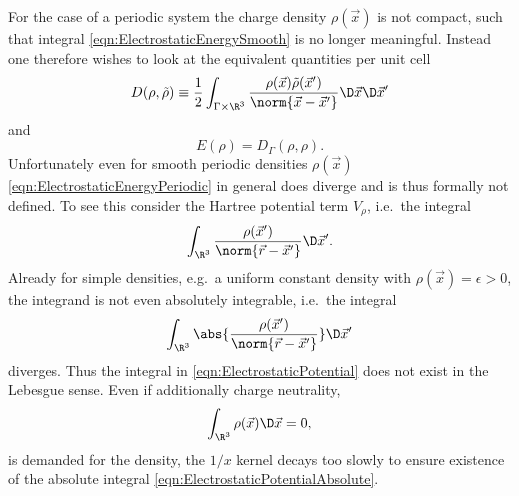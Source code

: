 \documentclass{MFHarticle}
\begin{document}
For the case of a periodic system the charge density $\rho(\vec{x})$ is not
compact, such that integral \eqref{eqn:ElectrostaticEnergySmooth}
is no longer meaningful.
Instead one therefore wishes to look
at the equivalent quantities per unit cell
\begin{equation}
	D(\rho, \tilde{\rho}) \equiv
	\frac12
	\int_{\Gamma \times \R^3}
	\frac{\rho(\vec{x}) \tilde{\rho}(\vec{x}')}{\norm{\vec{x} - \vec{x}'}}
	\D\vec{x} \D\vec{x}'
	\label{eqn:ElectrostaticEnergyPeriodic}
\end{equation}
and
\[
	E(\rho) = D_\Gamma(\rho, \rho).
\]
Unfortunately even for smooth periodic densities $\rho(\vec{x})$
\eqref{eqn:ElectrostaticEnergyPeriodic}
in general does diverge and is thus formally not defined.
To see this consider the Hartree potential term $V_\rho$,
i.e.~the integral
\begin{equation}
	\int_{\R^3}
	\frac{\rho(\vec{x}')}{\norm{\vec{r} - \vec{x}'}}
	\D\vec{x}'.
	\label{eqn:ElectrostaticPotential}
\end{equation}
Already for simple densities, e.g.~a uniform constant density
with $\rho(\vec{x}) = \epsilon > 0$,
the integrand is not even absolutely integrable,
i.e.~the integral
\begin{equation}
	\int_{\R^3} \abs{  \frac{\rho(\vec{x}')}{\norm{\vec{r} - \vec{x}'}}  }
	\D\vec{x}'
	\label{eqn:ElectrostaticPotentialAbsolute}
\end{equation}
diverges.
Thus the integral in \eqref{eqn:ElectrostaticPotential}
does not exist in the Lebesgue sense.
Even if additionally charge neutrality,
\[\int_{\R^3} \rho(\vec{x}) \D\vec{x} =0, \]
is demanded for the density,
the $1/x$ kernel decays too slowly to ensure existence
of the absolute integral \eqref{eqn:ElectrostaticPotentialAbsolute}.
\end{document}
